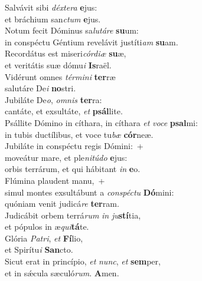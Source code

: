 \evenverse Salvávit sibi \textit{déx}\textit{te}\textit{ra} \textbf{e}jus:~\*\\
\evenverse et bráchium san\textit{ctum} \textbf{e}jus.\\
\oddverse Notum fecit Dóminus sa\textit{lu}\textit{tá}\textit{re} \textbf{su}um:~\*\\
\oddverse in conspéctu Géntium revelávit justíti\textit{am} \textbf{su}am.\\
\evenverse Recordátus est miseri\textit{cór}\textit{di}\textit{æ} \textbf{su}æ,~\*\\
\evenverse et veritátis suæ dómu\textit{i} \textbf{Is}raël.\\
\oddverse Vidérunt omnes \textit{tér}\textit{mi}\textit{ni} \textbf{ter}ræ~\*\\
\oddverse salutáre De\textit{i} \textbf{no}stri.\\
\evenverse Jubiláte De\textit{o}, \textit{om}\textit{nis} \textbf{ter}ra:~\*\\
\evenverse cantáte, et exsultáte, \textit{et} \textbf{psál}lite.\\
\oddverse Psállite Dómino in cíthara, in cíthara \textit{et} \textit{vo}\textit{ce} \textbf{psal}mi:~\*\\
\oddverse in tubis ductílibus, et voce tu\textit{bæ} \textbf{cór}neæ.\\
\evenverse Jubiláte in conspéctu regis Dómini:~+\\
\evenverse  moveátur mare, et ple\textit{ni}\textit{tú}\textit{do} \textbf{e}jus:~\*\\
\evenverse orbis terrárum, et qui hábitant \textit{in} \textbf{e}o.\\
\oddverse Flúmina plaudent manu,~+\\
\oddverse  simul montes exsultábunt a \textit{con}\textit{spé}\textit{ctu} \textbf{Dó}mini:~\*\\
\oddverse quóniam venit judicá\textit{re} \textbf{ter}ram.\\
\evenverse Judicábit orbem terrá\textit{rum} \textit{in} \textit{ju}\textbf{stí}tia,~\*\\
\evenverse et pópulos in æ\textit{qui}\textbf{tá}te.\\
\oddverse Glória \textit{Pa}\textit{tri}, \textit{et} \textbf{Fí}lio,~\*\\
\oddverse et Spirítu\textit{i} \textbf{San}cto.\\
\evenverse Sicut erat in princípio, \textit{et} \textit{nunc}, \textit{et} \textbf{sem}per,~\*\\
\evenverse et in sǽcula sæculó\textit{rum}. \textbf{A}men.\\
